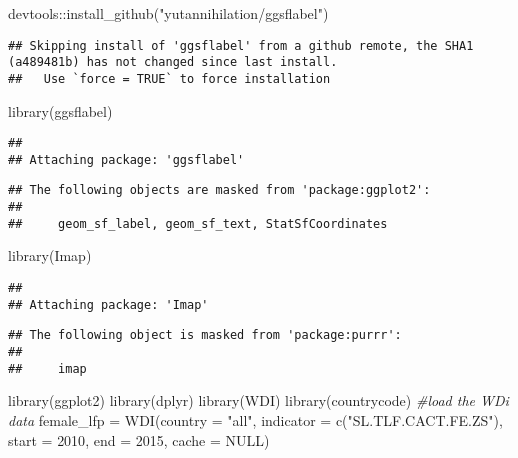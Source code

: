 \documentclass[
]{article}
\newenvironment{Shaded}{\begin{snugshade}}{\end{snugshade}}
\newcommand{\AttributeTok}[1]{\textcolor[rgb]{0.77,0.63,0.00}{#1}}
\newcommand{\CommentTok}[1]{\textcolor[rgb]{0.56,0.35,0.01}{\textit{#1}}}
\newcommand{\ConstantTok}[1]{\textcolor[rgb]{0.00,0.00,0.00}{#1}}
\newcommand{\DecValTok}[1]{\textcolor[rgb]{0.00,0.00,0.81}{#1}}
\newcommand{\FunctionTok}[1]{\textcolor[rgb]{0.00,0.00,0.00}{#1}}
\newcommand{\NormalTok}[1]{#1}
\newcommand{\OtherTok}[1]{\textcolor[rgb]{0.56,0.35,0.01}{#1}}
\newcommand{\SpecialCharTok}[1]{\textcolor[rgb]{0.00,0.00,0.00}{#1}}
\newcommand{\StringTok}[1]{\textcolor[rgb]{0.31,0.60,0.02}{#1}}
\begin{document}
\begin{Shaded}
\begin{Highlighting}[]
\NormalTok{devtools}\SpecialCharTok{::}\FunctionTok{install\_github}\NormalTok{(}\StringTok{"yutannihilation/ggsflabel"}\NormalTok{)}
\end{Highlighting}
\end{Shaded}

\begin{verbatim}
## Skipping install of 'ggsflabel' from a github remote, the SHA1 (a489481b) has not changed since last install.
##   Use `force = TRUE` to force installation
\end{verbatim}

\begin{Shaded}
\begin{Highlighting}[]
\FunctionTok{library}\NormalTok{(ggsflabel)}
\end{Highlighting}
\end{Shaded}

\begin{verbatim}
## 
## Attaching package: 'ggsflabel'
\end{verbatim}

\begin{verbatim}
## The following objects are masked from 'package:ggplot2':
## 
##     geom_sf_label, geom_sf_text, StatSfCoordinates
\end{verbatim}

\begin{Shaded}
\begin{Highlighting}[]
\FunctionTok{library}\NormalTok{(Imap)}
\end{Highlighting}
\end{Shaded}

\begin{verbatim}
## 
## Attaching package: 'Imap'
\end{verbatim}

\begin{verbatim}
## The following object is masked from 'package:purrr':
## 
##     imap
\end{verbatim}

\begin{Shaded}
\begin{Highlighting}[]
\FunctionTok{library}\NormalTok{(ggplot2)}
\FunctionTok{library}\NormalTok{(dplyr)}
\FunctionTok{library}\NormalTok{(WDI)}
\FunctionTok{library}\NormalTok{(countrycode)}
\CommentTok{\#load the WDi data}
\NormalTok{female\_lfp }\OtherTok{=} \FunctionTok{WDI}\NormalTok{(}\AttributeTok{country =} \StringTok{"all"}\NormalTok{, }\AttributeTok{indicator =} \FunctionTok{c}\NormalTok{(}\StringTok{"SL.TLF.CACT.FE.ZS"}\NormalTok{), }\AttributeTok{start =} \DecValTok{2010}\NormalTok{, }\AttributeTok{end =} \DecValTok{2015}\NormalTok{, }\AttributeTok{cache =} \ConstantTok{NULL}\NormalTok{)}
\end{Highlighting}
\end{Shaded}
\end{document}

